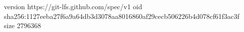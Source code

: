 version https://git-lfs.github.com/spec/v1
oid sha256:1127eeba27f6a9a64db3d3078aa8016860af29cecb506226b4d078cf61f3ac3f
size 2796368
